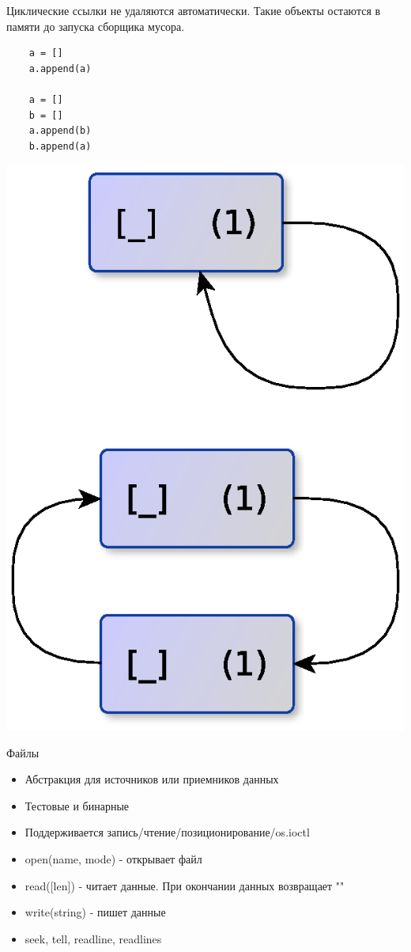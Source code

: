 \documentclass{article}
\begin{document}
\vspace{15pt}
Циклические ссылки не удаляются автоматически. Такие объекты остаются в памяти до
запуска сборщика мусора.
\begin{lstlisting}
	a = []
	a.append(a)

	a = []
	b = []
	a.append(b)
	b.append(a)
\end{lstlisting}
\begin{center} \includegraphics[scale=0.6]{images/cycle_ref.eps}\end{center}
\newpage

\begin{center} Файлы \end{center}
\begin{itemize}
	\item Абстракция для источников или приемников данных
	\item Тестовые и бинарные
	\item Поддерживается запись/чтение/позиционирование/os.ioctl
	\item open(name, mode) - открывает файл
	\item read([len]) - читает данные. При окончании данных возвращает ""
	\item write(string) - пишет данные
	\item seek, tell, readline, readlines
\end{itemize}
\newpage
\end{document}
